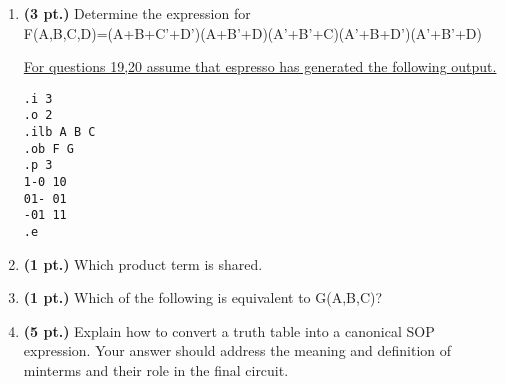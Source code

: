 \documentclass{article}
\begin{document}
\begin{enumerate}
\item {\bf (3 pt.)} Determine the \SOPmin expression for \\
F(A,B,C,D)=(A+B+C'+D')(A+B'+D)(A'+B'+C)(A'+B+D')(A'+B'+D)

\underline{For questions 19,20 assume that espresso has generated the following output.}
\begin{verbatim}
.i 3
.o 2
.ilb A B C
.ob F G
.p 3
1-0 10
01- 01
-01 11
.e
\end{verbatim}

\item{\bf (1 pt.)}  Which product term is shared.

\item{\bf (1 pt.)}  Which of the following is equivalent to G(A,B,C)?

\item{\bf (5 pt.)} Explain how to convert a truth table into a
canonical SOP expression.  Your answer should address the meaning
and definition of minterms and their role in the final circuit.


\end{enumerate}
\end{document}
